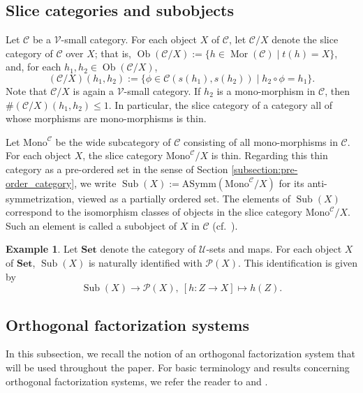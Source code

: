 \documentclass[12pt, a4paper]{amsart}
\theoremstyle{definition}
\newtheorem{example}[theorem]{Example}
\newcommand{\Mor}{\mathop{\mathrm{Mor}}\nolimits}
\newcommand{\Ob}{\mathop{\mathrm{Ob}}\nolimits}
\newcommand{\Mono}{\mathrm{Mono}}
\newcommand{\AS}{\mathrm{ASymm}}
\newcommand{\Set}{{\mathbf{Set}}}
\newcommand{\Sub}{\operatorname{Sub}}
\begin{document}
\subsection{Slice categories and subobjects}

Let $\mathcal{C}$ be a $\mathcal{V}$-small category. For each object $X$ of $\mathcal{C}$, let $\mathcal{C}/X$ denote the slice category of $\mathcal{C}$ over $X$; that is, $\Ob(\mathcal{C}/X) := \{ h \in \Mor(\mathcal{C}) \mid t(h) = X \}$, and, for each $h_1,h_2 \in \Ob(\mathcal{C}/X)$,
\[
(\mathcal{C}/X)(h_1,h_2) := \{ \phi \in \mathcal{C}(s(h_1),s(h_2)) \mid h_2 \circ \phi = h_1 \}.
\]
Note that $\mathcal{C}/X$ is again a $\mathcal{V}$-small category. If $h_2$ is a mono-morphism in $\mathcal{C}$, then $\#(\mathcal{C}/X)(h_1,h_2) \leq 1$. In particular, the slice category of a category all of whose morphisms are mono-morphisms is thin.

Let $\Mono^\mathcal{C}$ be the wide subcategory of $\mathcal{C}$ consisting of all mono-morphisms in $\mathcal{C}$. For each object $X$, the slice category $\Mono^\mathcal{C}/X$ is thin. Regarding this thin category as a pre-ordered set in the sense of Section \ref{subsection:pre-order_category}, we write $\Sub(X) := \AS(\Mono^\mathcal{C}/X)$ for its anti-symmetrization, viewed as a partially ordered set. The elements of $\Sub(X)$ correspond to the isomorphism classes of objects in the slice category $\Mono^\mathcal{C}/X$. Such an element is called a subobject of $X$ in $\mathcal{C}$ (cf.~\cite[Definition 4.7.8]{Riehl2016category}).

\begin{example}\label{example:SetSub}
Let $\Set$ denote the category of $\mathcal{U}$-sets and maps. For each object $X$ of $\Set$, $\Sub(X)$ is naturally identified with $\mathcal{P}(X)$. This identification is given by
\[
\Sub(X) \rightarrow \mathcal{P}(X), ~ [h : Z \rightarrow X] \mapsto h(Z).
\]
\end{example}

\subsection{Orthogonal factorization systems}

In this subsection, we recall the notion of an orthogonal factorization system that will be used throughout the paper.
For basic terminology and results concerning orthogonal factorization systems,
we refer the reader to \cite{EchiLazaarAbdallahi2015OFS} and \cite[Section~2]{FreydKelly1972}.
\end{document}
